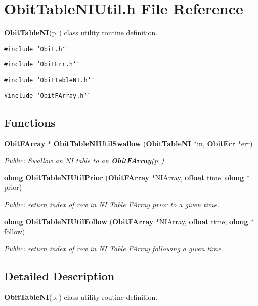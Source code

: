 \section{Obit\-Table\-NIUtil.h File Reference}
\label{ObitTableNIUtil_8h}
{\bf Obit\-Table\-NI}{\rm (p.\,\pageref{structObitTableNI})} class utility routine definition. 

{\tt \#include \char`\"{}Obit.h\char`\"{}}\par
{\tt \#include \char`\"{}Obit\-Err.h\char`\"{}}\par
{\tt \#include \char`\"{}Obit\-Table\-NI.h\char`\"{}}\par
{\tt \#include \char`\"{}Obit\-FArray.h\char`\"{}}\par
\subsection*{Functions}
\begin{CompactItemize}
\item 
{\bf Obit\-FArray} $\ast$ {\bf Obit\-Table\-NIUtil\-Swallow} ({\bf Obit\-Table\-NI} $\ast$in, {\bf Obit\-Err} $\ast$err)
\begin{CompactList}\small\item\em Public: Swallow an NI table to an {\bf Obit\-FArray}{\rm (p.\,\pageref{structObitFArray})}. \item\end{CompactList}\item 
{\bf olong} {\bf Obit\-Table\-NIUtil\-Prior} ({\bf Obit\-FArray} $\ast$NIArray, {\bf ofloat} time, {\bf olong} $\ast$prior)
\begin{CompactList}\small\item\em Public: return index of row in NI Table FArray prior to a given time. \item\end{CompactList}\item 
{\bf olong} {\bf Obit\-Table\-NIUtil\-Follow} ({\bf Obit\-FArray} $\ast$NIArray, {\bf ofloat} time, {\bf olong} $\ast$follow)
\begin{CompactList}\small\item\em Public: return index of row in NI Table FArray following a given time. \item\end{CompactList}\end{CompactItemize}


\subsection{Detailed Description}
{\bf Obit\-Table\-NI}{\rm (p.\,\pageref{structObitTableNI})} class utility routine definition. 



